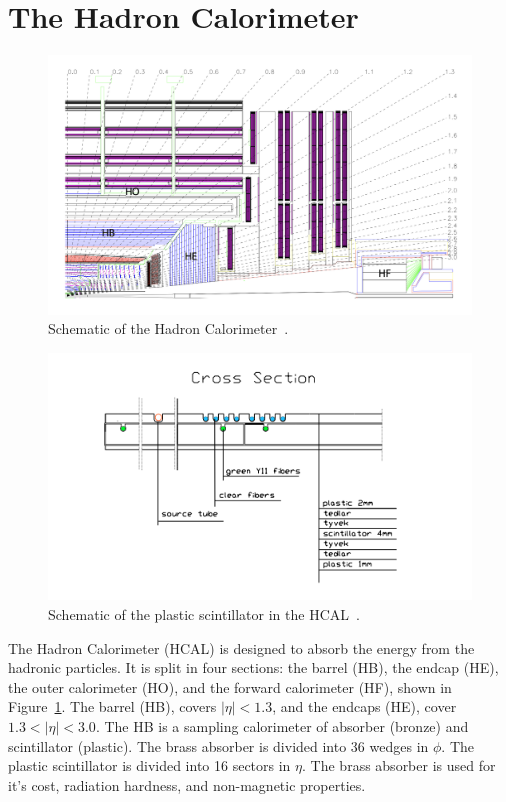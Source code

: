 \vspace{-3pt}
\section{The Hadron Calorimeter}\label{sec:ch3:hcal}

\begin{figure}[h]
\centering
\includegraphics[width=1.0\textwidth]{figures/HCAL.png}
\caption{Schematic of the Hadron Calorimeter~\cite{CMSExperiment}.}
\label{fig:HCAL}
\end{figure}


\begin{figure}[h]
\centering
\includegraphics[width=1.0\textwidth]{figures/hcal_scintillator_replace.png}
\caption{Schematic of the plastic scintillator in the HCAL~\cite{cmsdetector}.}
\label{fig:HCAL_scint}
\end{figure}

The Hadron Calorimeter (HCAL) is designed to absorb the energy from the hadronic particles. It is split in four sections: the barrel (HB), the endcap (HE), the outer calorimeter (HO), and the forward calorimeter (HF), shown in Figure~\ref{fig:HCAL}. The barrel (HB), covers $|\eta| < 1.3$, and the endcaps (HE), cover $1.3 < |\eta| < 3.0$. The HB is a sampling calorimeter of absorber (bronze) and scintillator (plastic). The brass absorber is divided into 36 wedges in $\phi$. The plastic scintillator is divided into 16 sectors in $\eta$. The brass absorber is used for it's cost, radiation hardness, and non-magnetic properties.

